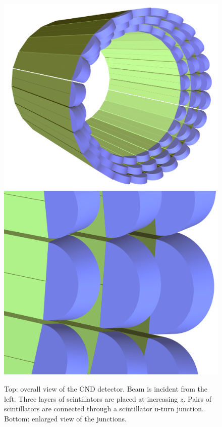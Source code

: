\begin{figure}
	\centering
	\includegraphics[width=0.99\columnwidth,keepaspectratio]{img/cndGeometry.png}
	\includegraphics[width=0.99\columnwidth,keepaspectratio]{img/cndDetail.png}
	\caption{Top: overall view of the CND detector. Beam is incident from the left.
	         Three layers of scintillators are placed at increasing $z$. Pairs of scintillators
             are connected through a scintillator u-turn junction. Bottom: enlarged view of the junctions. }
	\label{fig:cndGeometry}
\end{figure}

